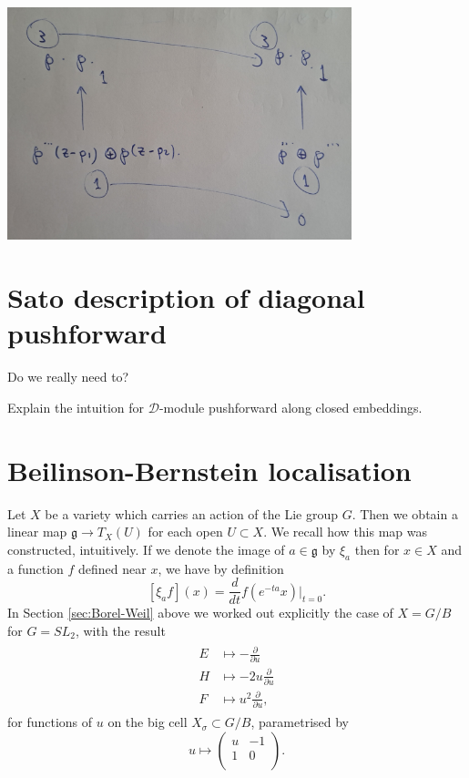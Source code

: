 \documentclass[12pt]{article}
\theoremstyle{plain}
\theoremstyle{definition}
\numberwithin{equation}{section}
\newcommand{\g}{\mathfrak{g}}
\newcommand{\CD}{\mathcal{D}}
\begin{document}
{\begin{center}
\includegraphics[width=100mm]{elliptic-cech.png}
\end{center}



}















\section{Sato description of diagonal pushforward}


Do we really need to?


{\color{red}Explain the intuition for $\CD$-module pushforward along closed embeddings.}




\section{Beilinson-Bernstein localisation}




Let $X$ be a variety which carries an action of the Lie group $G$. Then we obtain a linear map $\g \rightarrow T_X(U)$ for each open $U \subset X$. We recall how this map was constructed, intuitively. If we denote the image of $a \in \g$ by $\xi_a$ then for $x \in X$ and a function $f$ defined near $x$, we have by definition
\[
[\xi_a f](x) = \frac{d}{dt} f(e^{-ta} x)|_{t=0}.
\]
In Section \ref{sec:Borel-Weil} above we worked out explicitly the case of $X = G / B$ for $G = SL_2$, with the result
\begin{align}\label{eq:untwisted.DO}
\begin{split}
E &\mapsto -\frac{\partial}{\partial u} \\
%
H &\mapsto -2 u \frac{\partial}{\partial u} \\
%
F &\mapsto u^2 \frac{\partial}{\partial u},
\end{split}
\end{align}
for functions of $u$ on the big cell $X_\sigma \subset G / B$, parametrised by
\[
u \mapsto \left(\begin{array}{cc}
u & -1 \\
1 & 0 \\
\end{array}
\right).
\]
\end{document}
